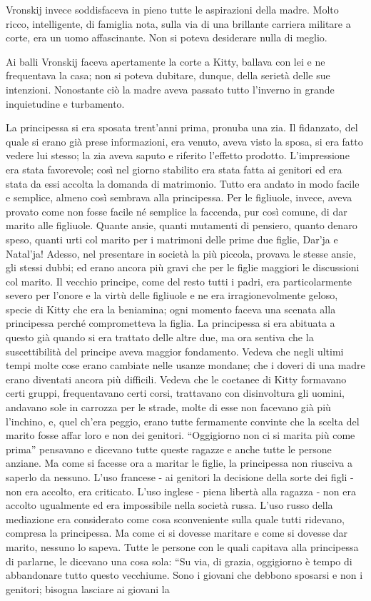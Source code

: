 Vronskij invece soddisfaceva in pieno tutte le aspirazioni della madre. Molto ricco, intelligente, di famiglia nota, sulla via di una brillante carriera militare a corte, era un uomo affascinante. Non si poteva desiderare nulla di meglio. 

Ai balli Vronskij faceva apertamente la corte a Kitty, ballava con lei e ne frequentava la casa; non si poteva dubitare, dunque, della serietà delle sue intenzioni. Nonostante ciò la madre aveva passato tutto l'inverno in grande inquietudine e turbamento. 

La principessa si era sposata trent'anni prima, pronuba una zia. Il fidanzato, del quale si erano già prese informazioni, era venuto, aveva visto la sposa, si era fatto vedere lui stesso; la zia aveva saputo e riferito l'effetto prodotto. L'impressione era stata favorevole; così nel giorno stabilito era stata fatta ai genitori ed era stata da essi accolta la domanda di matrimonio. Tutto era andato in modo facile e semplice, almeno così sembrava alla principessa. Per le figliuole, invece, aveva provato come non fosse facile né semplice la faccenda, pur così comune, di dar marito alle figliuole. Quante ansie, quanti mutamenti di pensiero, quanto denaro speso, quanti urti col marito per i matrimoni delle prime due figlie, Dar'ja e Natal'ja! Adesso, nel presentare in società la più piccola, provava le stesse ansie, gli stessi dubbi; ed erano ancora più gravi che per le figlie maggiori le discussioni col marito. Il vecchio principe, come del resto tutti i padri, era particolarmente severo per l'onore e la virtù delle figliuole e ne era irragionevolmente geloso, specie di Kitty che era la beniamina; ogni momento faceva una scenata alla principessa perché comprometteva la figlia. La principessa si era abituata a questo già quando si era trattato delle altre due, ma ora sentiva che la suscettibilità del principe aveva maggior fondamento. Vedeva che negli ultimi tempi molte cose erano cambiate nelle usanze mondane; che i doveri di una madre erano diventati ancora più difficili. Vedeva che le coetanee di Kitty formavano certi gruppi, frequentavano certi corsi, trattavano con disinvoltura gli uomini, andavano sole in carrozza per le strade, molte di esse non facevano già più l'inchino, e, quel ch'era peggio, erano tutte fermamente convinte che la scelta del marito fosse affar loro e non dei genitori. ``Oggigiorno non ci si marita più come prima'' pensavano e dicevano tutte queste ragazze e anche tutte le persone anziane. Ma come si facesse ora a maritar le figlie, la principessa non riusciva a saperlo da nessuno. L'uso francese - ai genitori la decisione della sorte dei figli - non era accolto, era criticato. L'uso inglese - piena libertà alla ragazza - non era accolto ugualmente ed era impossibile nella società russa. L'uso russo della mediazione era considerato come cosa sconveniente sulla quale tutti ridevano, compresa la principessa. Ma come ci si dovesse maritare e come si dovesse dar marito, nessuno lo sapeva. Tutte le persone con le quali capitava alla principessa di parlarne, le dicevano una cosa sola: ``Su via, di grazia, oggigiorno è tempo di abbandonare tutto questo vecchiume. Sono i giovani che debbono sposarsi e non i genitori; bisogna lasciare ai giovani la 